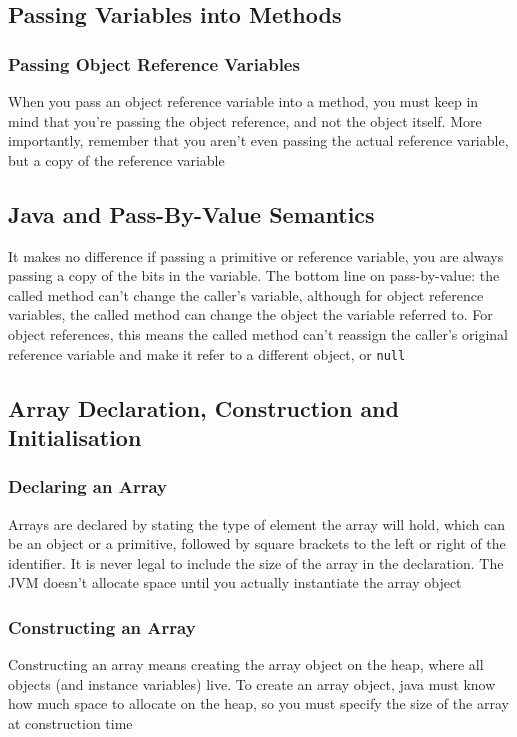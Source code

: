 \subsection{Passing Variables into Methods}
\subsubsection{Passing Object Reference Variables}
When you pass an object reference variable into a method, you must keep in mind 
that you're passing the object reference, and not the object itself. More 
importantly, remember that you aren't even passing the actual reference 
variable, but a copy of the reference variable

\subsection{Java and Pass-By-Value Semantics}
It makes no difference if passing a primitive or reference variable, you are 
always passing a copy of the bits in the variable. The bottom line on 
pass-by-value: the called method can't change the caller's variable, although 
for object reference variables, the called method can change the object the 
    variable referred to. For object references, this means the called method 
    can't reassign the caller's original reference variable and make it refer 
    to a different object, or \verb#null#

\subsection{Array Declaration, Construction and Initialisation}
\subsubsection{Declaring an Array}
Arrays are declared by stating the type of element the array will hold, which 
can be an object or a primitive, followed by square brackets to the left or 
right of the identifier. It is never legal to include the size of the array in 
the declaration. The JVM doesn't allocate space until you actually instantiate 
the array object

\subsubsection{Constructing an Array}
Constructing an array means creating the array object on the heap, where all 
objects (and instance variables) live. To create an array object, java must 
know how much space to allocate on the heap, so you must specify the size of 
the array at construction time

